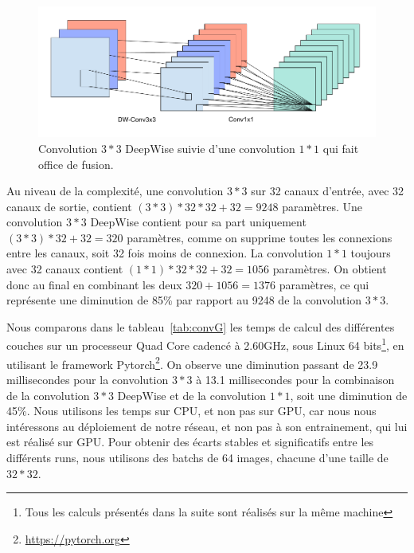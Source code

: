 \begin{figure}%
\includegraphics[width=\columnwidth]{figures/groupConvolutionPlusFusion.png}%
\caption{Convolution $3*3$ DeepWise suivie d'une convolution $1*1$ qui fait office de fusion.}%
\label{fig:conv31}%
\end{figure}

Au niveau de la complexité, une convolution $3*3$ sur 32 canaux d'entrée, avec 32 canaux de sortie, contient $ (3*3)*32*32 + 32 = 9248$ paramètres.
Une convolution $3*3$ DeepWise contient pour sa part uniquement $ (3*3)*32 + 32 = 320$ paramètres, comme on supprime toutes les connexions entre les canaux, soit 32 fois moins de connexion.
La convolution $1*1$ toujours avec 32 canaux contient $(1*1)*32*32 + 32 = 1056$ paramètres.
On obtient donc au final en combinant les deux $ 320 + 1056 = 1376$ paramètres, ce qui représente une diminution de 85\% par rapport au 9248 de la convolution $3*3$.


Nous comparons dans le tableau~\ref{tab:convG} les temps de calcul des différentes couches sur un processeur Quad Core cadencé à 2.60GHz, sous Linux 64 bits\footnote{Tous les calculs présentés dans la suite sont réalisés sur la même machine}, en utilisant le framework Pytorch\footnote{\url{https://pytorch.org}}. 
On observe une diminution passant de 23.9 millisecondes pour la convolution $3*3$ à 13.1 millisecondes pour la combinaison de la convolution $3*3$ DeepWise et de la convolution $1*1$, soit une diminution de 45\%. 
Nous utilisons les temps sur CPU, et non pas sur GPU, car nous nous intéressons au déploiement de notre réseau, et non pas à son entrainement, qui lui est réalisé sur GPU.
Pour obtenir des écarts stables et significatifs entre les différents runs, nous utilisons des batchs de 64 images, chacune d'une taille de $32*32$.

